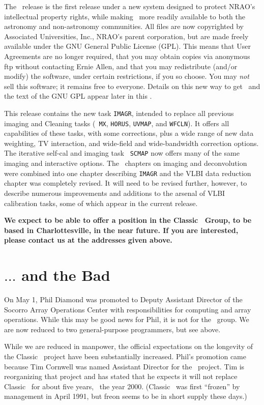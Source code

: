 The \RELEASENAME\ release is the first release under a new system
designed to protect NRAO's intellectual property rights, while making
\AIPS\ more readily available to both the astronomy and non-astronomy
communities.  All files are now copyrighted by Associated
Universities, Inc., NRAO's parent corporation, but are made freely
available under the GNU General Public License \hbox{(GPL)}.  This
means that User Agreements are no longer required, that you may obtain
copies via anonymous ftp without contacting Ernie Allen, and that you
may redistribute (and/or modify) the software, under certain
restrictions, if you so choose.  You may {\it not} sell this software;
it remains free to everyone.  Details on this new way to get \AIPS\
and the text of the GNU GPL appear later in this \Aipsletter.

This release contains the new task {\tt IMAGR}, intended to replace
all previous imaging and Cleaning tasks (\eg\ {\tt MX}, {\tt HORUS},
{\tt UVMAP}, and \hbox{{\tt WFCLN}}).  It offers all capabilities of
these tasks, with some corrections, plus a wide range of new data
weighting, TV interaction, and wide-field and wide-bandwidth
correction options.  The iterative self-cal and imaging task {\tt
SCMAP} now offers many of the same imaging and interactive options.
The \Cookbook\ chapters on imaging and deconvolution were combined
into one chapter describing {\tt IMAGR} and the VLBI data reduction
chapter was completely revised.  It will need to be revised further,
however, to describe numerous improvements and additions to the
arsenal of VLBI calibration tasks, some of which appear in the current
release.

{\large \bf We expect to be able to offer a position in the Classic
\AIPS\ Group, to be based in Charlottesville, in the near future.  If
you are interested, please contact us at the addresses given above.}

\section{$\ldots$ and the Bad}

On May 1, Phil Diamond was promoted to Deputy Assistant Director of
the Socorro Array Operations Center with responsibilities for
computing and array operations.  While this may be good news for Phil,
it is not for the \AIPS\ group.  We are now reduced to two
general-purpose programmers, but see above.
\vfill\eject

While we are reduced in manpower, the official expectations on the
longevity of the Classic \AIPS\ project have been substantially
increased.  Phil's promotion came because Tim Cornwell was named
Assistant Director for the \AIPTOO\ project.  Tim is reorganizing that
project and has stated that he expects it will not replace Classic
\AIPS\ for about five years, \ie\ the year 2000.  (Classic \AIPS\ was
first ``frozen'' by management in April 1991, but freon seems to be in
short supply these days.)

